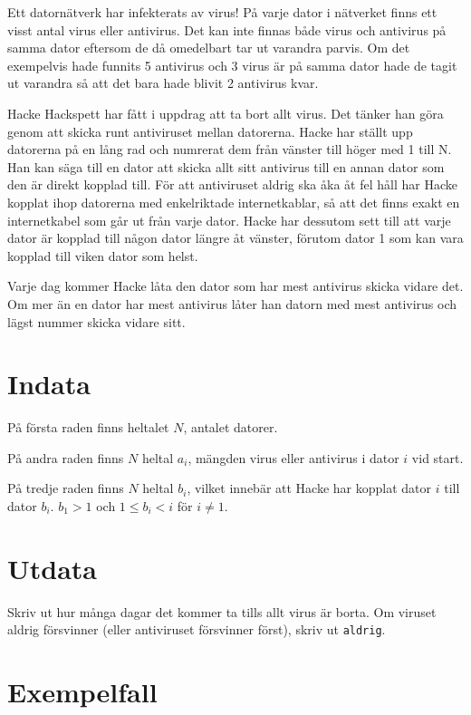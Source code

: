 
Ett datornätverk har infekterats av virus! På varje dator i nätverket finns ett visst antal virus eller antivirus. Det kan inte finnas både virus och antivirus på samma dator eftersom de då omedelbart tar ut varandra parvis. Om det exempelvis hade funnits 5 antivirus och 3 virus är på samma dator hade de tagit ut varandra så att det bara hade blivit 2 antivirus kvar.

Hacke Hackspett har fått i uppdrag att ta bort allt virus. Det tänker han göra genom att skicka runt antiviruset mellan datorerna. Hacke har ställt upp datorerna på en lång rad och numrerat dem från vänster till höger med 1 till N. Han kan säga till en dator att skicka allt sitt antivirus till en annan dator som den är direkt kopplad till. För att antiviruset aldrig ska åka åt fel håll har Hacke kopplat ihop datorerna med enkelriktade internetkablar, så att det finns exakt en internetkabel som går ut från varje dator. Hacke har dessutom sett till att varje dator är kopplad till någon dator längre åt vänster, förutom dator 1 som kan vara kopplad till viken dator som helst.

Varje dag kommer Hacke låta den dator som har mest antivirus skicka vidare det. Om mer än en dator har mest antivirus låter han datorn med mest antivirus och lägst nummer skicka vidare sitt.

\section*{Indata}
På första raden finns heltalet $N$, antalet datorer.

På andra raden finns $N$ heltal $a_i$, mängden virus eller antivirus i dator $i$ vid start.

På tredje raden finns $N$ heltal $b_i$, vilket innebär att Hacke har kopplat dator $i$ till dator $b_i$. $b_1 > 1$ och $1 \leq b_i < i$ för $i \neq 1$.

\section*{Utdata}
Skriv ut hur många dagar det kommer ta tills allt virus är borta. Om viruset aldrig försvinner (eller antiviruset försvinner först), skriv ut \texttt{aldrig}.

\section*{Exempelfall}

